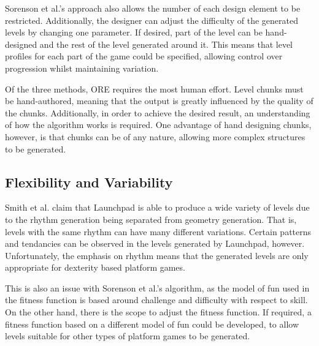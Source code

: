 \documentclass{scrartcl}
\begin{document}
Sorenson et al.'s approach also allows the number of each design element to be restricted. Additionally, the designer can adjust the difficulty of the generated levels by changing one parameter. If desired, part of the level can be hand-designed and the rest of the level generated around it. This means that level profiles for each part of the game could be specified, allowing control over progression whilst maintaining variation. 


Of the three methods, ORE requires the most human effort. Level chunks must be hand-authored, meaning that the output is greatly influenced by the quality of the chunks. Additionally, in order to achieve the desired result, an understanding of how the algorithm works is required. One advantage of hand designing chunks, however, is that chunks can be of any nature, allowing more complex structures to be generated.


\subsection{Flexibility and Variability}

Smith et al. claim that Launchpad is able to produce a wide variety of levels due to the rhythm generation being separated from geometry generation. That is, levels with the same rhythm can have many different variations. Certain patterns and tendancies can be observed in the levels generated by Launchpad, however. Unfortunately, the emphasis on rhythm means that the generated levels are only appropriate for dexterity based platform games.

This is also an issue with Sorenson et al.'s algorithm, as the model of fun used in the fitness function is based around challenge and difficulty with respect to skill. On the other hand, there is the scope to adjust the fitness function. If required, a fitness function based on a different model of fun could be developed, to allow levels suitable for other types of platform games to be generated.
\end{document}

